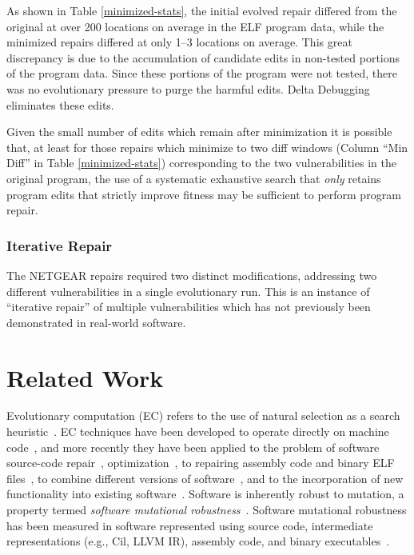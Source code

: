 \documentclass{sig-alternate}
\begin{document}
As shown in Table \ref{minimized-stats}, the initial evolved repair
differed from the original at over 200 locations on average in the ELF
program data, while the minimized repairs differed at only 1--3
locations on average.  This great discrepancy is due to the
accumulation of candidate edits in non-tested portions of the program
data.  Since these portions of the program were not tested, there was
no evolutionary pressure to purge the harmful edits.
Delta Debugging eliminates these edits.

Given the small number of edits which remain after minimization it is
possible that, at least for those repairs which minimize to two diff
windows (Column ``Min Diff'' in Table \ref{minimized-stats})
corresponding to the two vulnerabilities in the original program, the
use of a systematic exhaustive search that {\em only} retains program
edits that strictly improve fitness may be sufficient to perform
program repair.

\subsubsection{Iterative Repair}
\label{iterative-repair}
The NETGEAR repairs required two distinct modifications, addressing
two different vulnerabilities in a single evolutionary run.  This is
an instance of ``iterative repair'' of multiple vulnerabilities which
has not previously been demonstrated in real-world software.

\section{Related Work}
\label{sec:related-work}

Evolutionary computation (EC) refers to the use of natural selection
as a search heuristic~\cite{holland1992adaptation,koza1992genetic}.
EC techniques have been developed to operate directly on machine
code~\cite{kuhling2002brute}, and more recently they have been applied
to the problem of software source-code
repair~\cite{genprog-tse-journal,arcuri2011evolutionary},
optimization~\cite{sitthi2011genetic,schulte2013optimization,LangdonAndHarmon2015a},
to repairing assembly code and binary ELF
files~\cite{SchulteEtAl2010a,schulte2013embedded}, to combine
different versions of software~\cite{foster2010object,petke2014using},
and to the incorporation of new functionality into existing
software~\cite{harman2014babel}.  Software is inherently robust to
mutation, a property termed {\em software mutational
  robustness}~\cite{schulte2013software}.  Software mutational
robustness has been measured in software represented using source
code, intermediate representations (e.g., {\sc Cil}, LLVM IR),
assembly code, and binary executables~\cite{schulte2014dissertation}.
\end{document}
